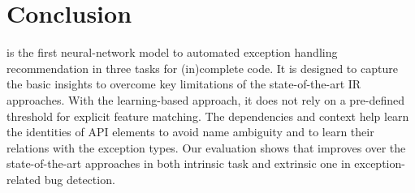 \section{Conclusion}

{\tool} is the first neural-network model to automated exception
handling recommendation in three tasks for (in)complete code. It is
designed to capture the basic insights to overcome key limitations of
the state-of-the-art IR approaches. With the learning-based approach,
it does not rely on a pre-defined threshold for explicit feature
matching. The dependencies and context help {\tool} learn the
identities of API elements to avoid name ambiguity and to learn their
relations with the exception types. Our evaluation shows
that {\tool} improves over the state-of-the-art approaches in both
intrinsic task and extrinsic one in exception-related bug detection.
